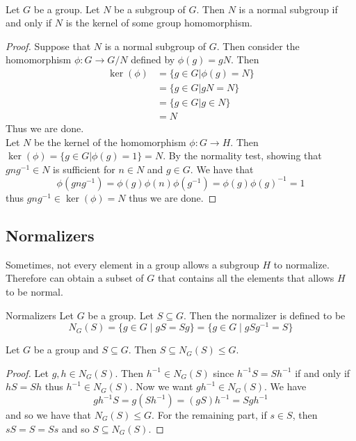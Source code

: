 \documentclass[a4paper]{article}
\begin{document}
\begin{prp}{}{}\\
Let $G$ be a group. Let $N$ be a subgroup of $G$. Then $N$ is a normal subgroup if and only if $N$ is the kernel of some group homomorphism. 
\begin{proof}
Suppose that $N$ is a normal subgroup of $G$. Then consider the homomorphism $\phi:G\to G/N$ defined by $\phi(g)=gN$. Then
\begin{align*}
\ker(\phi)&=\{g\in G|\phi(g)=N\}\\
&=\{g\in G|gN=N\}\\
&=\{g\in G|g\in N\}\\
&=N
\end{align*} Thus we are done. \\

Let $N$ be the kernel of the homomorphism $\phi:G\to H$. Then $\ker(\phi)=\{g\in G|\phi(g)=1\}=N$. By the normality test, showing that $gng^{-1}\in N$ is sufficient for $n\in N$ and $g\in G$. We have that $$\phi(gng^{-1})=\phi(g)\phi(n)\phi(g^{-1})=\phi(g)\phi(g)^{-1}=1$$ thus $gng^{-1}\in\ker(\phi)=N$ thus we are done. 
\end{proof}
\end{prp}

\subsection{Normalizers}
Sometimes, not every element in a group allows a subgroup $H$ to normalize. Therefore can obtain a subset of $G$ that  contains all the elements that allows $H$ to be normal. 

\begin{defn}{Normalizers}{} Let $G$ be a group. Let $S\subseteq G$. Then the normalizer is defined to be $$N_G(S)=\{g\in G\;|\;gS=Sg\}=\{g\in G\;|\;gSg^{-1}=S\}$$
\end{defn}

\begin{prp}{}{} Let $G$ be a group and $S\subseteq G$. Then $S\subseteq N_G(S)\leq G$. 
\begin{proof}
Let $g,h\in N_G(S)$. Then $h^{-1}\in N_G(S)$ since $h^{-1}S=Sh^{-1}$ if and only if $hS=Sh$ thus $h^{-1}\in N_G(S)$. Now we want $gh^{-1}\in N_G(S)$. We have $$gh^{-1}S=g(Sh^{-1})=(gS)h^{-1}=Sgh^{-1}$$ and so we have that $N_G(S)\leq G$. For the remaining part, if $s\in S$, then $sS=S=Ss$ and so $S\subseteq N_G(S)$. 
\end{proof}
\end{prp}
\end{document}
